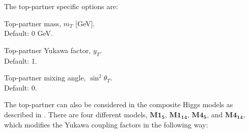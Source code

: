 \documentclass[12pt,a4wide]{article}
\begin{document}
The top-partner specific options are: 
\begin{description}[labelindent=\parindent, labelwidth =\widthof{\bfseries9999999999999999999999}, leftmargin = !] 
	\item[\texttt{--mtp <value>}] Top-partner mass, $m_{T}$ [GeV]. \\ Default: 0 GeV. 
	\item[\texttt{--ytp <value>}] Top-partner Yukawa factor, $y_T$. \\ Default: 1. 
	\item[\texttt{--sth2 <value>}] Top-partner mixing angle, $\sin^2 \theta_T$. \\ Default: 0. 
\end{description} 
The top-partner can also be considered in the composite Higgs models as described in \cite{}. There are four different models, $\textbf{M1}_{\textbf{5}}$, $\textbf{M1}_{\textbf{14}}$, $\textbf{M4}_{\textbf{5}}$, and $\textbf{M4}_{\textbf{14}}$, which modifies the Yukawa coupling factors in the following way: 
\end{document}
